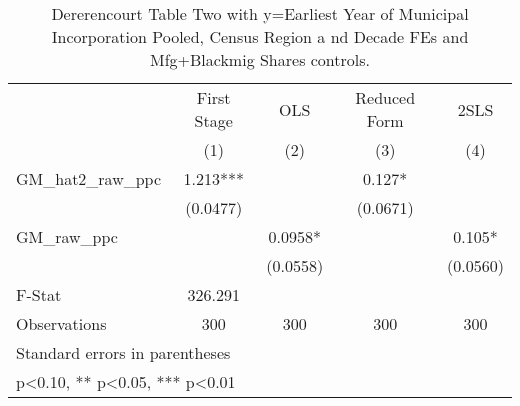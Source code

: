 \begin{table}[htbp]\centering
\def\sym#1{\ifmmode^{#1}\else\(^{#1}\)\fi}
\caption{Dererencourt Table Two with y=Earliest Year of Municipal Incorporation  Pooled, Census Region a nd Decade FEs and Mfg+Blackmig Shares controls.}
\begin{tabular}{l*{4}{c}}
\toprule
                    & First Stage   &         OLS   &Reduced Form   &        2SLS   \\
                    &\multicolumn{1}{c}{(1)}   &\multicolumn{1}{c}{(2)}   &\multicolumn{1}{c}{(3)}   &\multicolumn{1}{c}{(4)}   \\
\midrule
GM\_hat2\_raw\_ppc     &       1.213***&               &       0.127*  &               \\
                    &    (0.0477)   &               &    (0.0671)   &               \\
\addlinespace
GM\_raw\_ppc          &               &      0.0958*  &               &       0.105*  \\
                    &               &    (0.0558)   &               &    (0.0560)   \\
\midrule
F-Stat              &     326.291   &               &               &               \\
Observations        &         300   &         300   &         300   &         300   \\
\bottomrule
\multicolumn{5}{l}{\footnotesize Standard errors in parentheses}\\
\multicolumn{5}{l}{\footnotesize * p<0.10, ** p<0.05, *** p<0.01}\\
\end{tabular}
\end{table}
